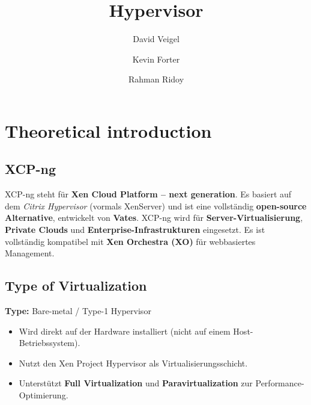 \documentclass[BMR,Seminar,ngerman,IEEE]{twbook}
\title{Hypervisor}
\author{David Veigel \and Kevin Forter \and Rahman Ridoy}
\begin{document}
\maketitle

\onecolumn
\newpage

\chapter{Theoretical introduction}

\section{XCP-ng}
XCP-ng steht für \textbf{Xen Cloud Platform – next generation}.  
Es basiert auf dem \textit{Citrix Hypervisor} (vormals XenServer) und ist eine vollständig \textbf{open-source Alternative}, entwickelt von \textbf{Vates}.  
XCP-ng wird für \textbf{Server-Virtualisierung}, \textbf{Private Clouds} und \textbf{Enterprise-Infrastrukturen} eingesetzt.  
Es ist vollständig kompatibel mit \textbf{Xen Orchestra (XO)} für webbasiertes Management.

\section{Type of Virtualization}
\textbf{Type:} Bare-metal / Type-1 Hypervisor  

\begin{itemize}[noitemsep]
  \item Wird direkt auf der Hardware installiert (nicht auf einem Host-Betriebssystem).
  \item Nutzt den Xen Project Hypervisor als Virtualisierungsschicht.
  \item Unterstützt \textbf{Full Virtualization} und \textbf{Paravirtualization} zur Performance-Optimierung.
\end{itemize}

\end{document}
